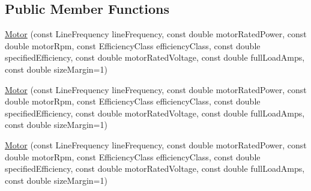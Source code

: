 \subsection*{Public Member Functions}
\begin{DoxyCompactItemize}
\item 
\hyperlink{struct_motor_a0cc70d1db8f8a1128465871e2297f2d9}{Motor} (const Line\+Frequency line\+Frequency, const double motor\+Rated\+Power, const double motor\+Rpm, const Efficiency\+Class efficiency\+Class, const double specified\+Efficiency, const double motor\+Rated\+Voltage, const double full\+Load\+Amps, const double size\+Margin=1)
\item 
\hyperlink{struct_motor_a0cc70d1db8f8a1128465871e2297f2d9}{Motor} (const Line\+Frequency line\+Frequency, const double motor\+Rated\+Power, const double motor\+Rpm, const Efficiency\+Class efficiency\+Class, const double specified\+Efficiency, const double motor\+Rated\+Voltage, const double full\+Load\+Amps, const double size\+Margin=1)
\item 
\hyperlink{struct_motor_a0cc70d1db8f8a1128465871e2297f2d9}{Motor} (const Line\+Frequency line\+Frequency, const double motor\+Rated\+Power, const double motor\+Rpm, const Efficiency\+Class efficiency\+Class, const double specified\+Efficiency, const double motor\+Rated\+Voltage, const double full\+Load\+Amps, const double size\+Margin=1)
\end{DoxyCompactItemize}
